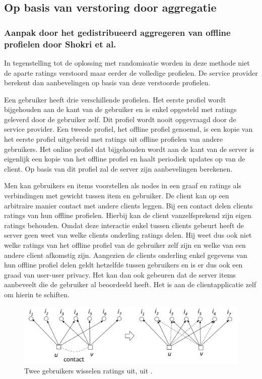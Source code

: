 
\subsection{Op basis van verstoring door aggregatie}

\subsubsection{Aanpak door het gedistribueerd aggregeren van offline profielen door Shokri et al. \cite{LCA-CONF-2009-014}}

In tegenstelling tot de oplossing met randomisatie worden in deze methode niet de aparte ratings verstoord maar eerder de volledige profielen. De service provider berekent dan aanbevelingen op basis van deze verstoorde profielen. 

Een gebruiker heeft drie verschillende profielen. Het eerste profiel wordt bijgehouden aan de kant van de gebruiker en is enkel opgesteld met ratings geleverd door de gebruiker zelf. Dit profiel wordt nooit opgevraagd door de service provider. Een tweede profiel, het offline profiel genoemd, is een kopie van het eerste profiel uitgebreid met ratings uit offline profielen van andere gebruikers. Het online profiel dat bijgehouden wordt aan de kant van de server is eigenlijk een kopie van het offline profiel en haalt periodiek updates op van de client. Op basis van dit profiel zal de server zijn aanbevelingen berekenen.

Men kan gebruikers en items voorstellen als nodes in een graaf en ratings als verbindingen met gewicht tussen item en gebruiker. De client kan op een arbitraire manier contact met andere clients leggen. Bij een contact delen clients ratings van hun offline profielen. Hierbij kan de client vanzelfsprekend zijn eigen ratings behouden. Omdat deze interactie enkel tussen clients gebeurt heeft de server geen weet van welke clients onderling ratings delen. Hij weet dus ook niet welke ratings van het offline profiel van de gebruiker zelf  zijn en welke van een andere client afkomstig zijn.  Aangezien de clients onderling enkel gegevens van hun offline profiel delen geldt hetzelfde tussen gebruikers en is er dus ook een graad van user-user privacy. Het kan dan ook gebeuren dat de server items aanbeveelt die de gebruiker al beoordeeld heeft. Het is aan de clientapplicatie zelf om hierin te schiften.

\begin{figure}[htpb]   
    \label{Figuur::aggregatiefig}      
  \begin{center}    
 \includegraphics[scale=0.35]{fig/aggregatie}    
  \end{center}   
  \caption{Twee gebruikers wisselen ratings uit, uit \cite{LCA-CONF-2009-014}.}  
   \end{figure} 

